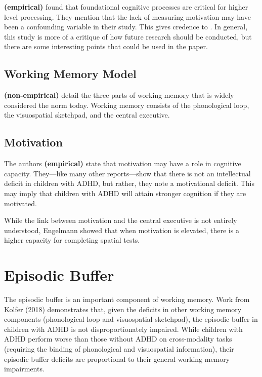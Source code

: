 \documentclass[stu]{apa7}
\begin{document}
\textcite{mohamed_basic_2021} \textbf{(empirical)} found that foundational cognitive processes are critical for higher level processing. They mention that the lack of measuring motivation may have been a confounding variable in their study. This gives credence to \textcite{skalski_impact_2021}. In general, this study is more of a critique of how future research should be conducted, but there are some interesting points that could be used in the paper.

\subsection{Working Memory Model}

\textcite{baddeley_developments_1994} \textbf{(non-empirical)} detail the three parts of working memory that is widely considered the norm today. Working memory consists of the phonological loop, the visuospatial sketchpad, and the central executive. 

\subsection{Motivation}
The authors \textcite{skalski_impact_2021} \textbf{(empirical)} state that motivation may have a role in cognitive capacity. They---like many other reports---show that there is not an intellectual deficit in children with ADHD, but rather, they note a motivational deficit. This may imply that children with ADHD will attain stronger cognition if they are motivated.

While the link between motivation and the central executive is not entirely understood, Engelmann showed that when motivation is elevated, there is a higher capacity for completing spatial tests. 

\section{Episodic Buffer}

The episodic buffer is an important component of working memory. Work from Kolfer (2018) demonstrates that, given the deficits in other working memory components (phonological loop and visuospatial sketchpad), the episodic buffer in children with ADHD is not disproportionately impaired. While children with ADHD perform worse than those without ADHD on cross-modality tasks (requiring the binding of phonological and visuospatial information), their episodic buffer deficits are proportional to their general working memory impairments.


\printbibliography
\end{document}
